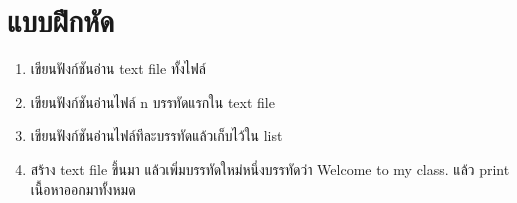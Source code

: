 \section{แบบฝึกหัด}
\begin{enumerate} 
\item 	เขียนฟังก์ชันอ่าน text file ทั้งไฟล์
\item 	เขียนฟังก์ชันอ่านไฟล์ n บรรทัดแรกใน text file
\item 	เขียนฟังก์ชันอ่านไฟล์ทีละบรรทัดแล้วเก็บไว้ใน list
\item 	สร้าง text file ขึ้นมา แล้วเพิ่มบรรทัดใหม่หนึ่งบรรทัดว่า Welcome to my class. แล้ว print เนื้อหาออกมาทั้งหมด
\end{enumerate}



